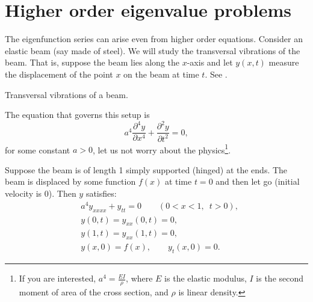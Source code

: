 
\sectionnewpage
\section{Higher order eigenvalue problems}
\label{sec:appeig}


The eigenfunction series can arise even from higher order equations.
Consider an elastic beam (say made of steel).  We will study the
transversal vibrations of the beam.  That is, suppose the beam lies along
the $x$-axis and let $y(x,t)$ measure the displacement of the point $x$
on the beam at time $t$.  See .

\begin{myfig}
\capstart
{}
\caption{Transversal vibrations of a beam.\label{appeig:transbeamfig}}
\end{myfig}

The equation that governs this setup is
\begin{equation*}
a^4 \frac{\partial^4 y}{\partial x^4} + \frac{\partial^2 y}{\partial t^2} = 0,
\end{equation*}
for some constant $a > 0$, let us not worry about the physics\footnote{If
you are interested, $a^4 = \frac{EI}{\rho}$, where $E$ is the elastic
modulus, $I$ is the second moment of area of the cross section,
and $\rho$ is linear density.}.

Suppose the beam is of length 1 simply supported (hinged) at the ends.
The beam is displaced by some function $f(x)$ at time $t=0$ and then
let go (initial velocity is 0).  Then $y$ satisfies:
\begin{equation} \label{appeig:beameq}
\begin{aligned}
& a^4 y_{xxxx} + y_{tt} = 0 \qquad (0 < x < 1, \enspace t > 0), \\
& y(0,t) = y_{xx}(0,t) = 0 , \\
& y(1,t) = y_{xx}(1,t) = 0 , \\
& y(x,0) = f(x), \qquad y_{t}(x,0) = 0 .
\end{aligned}
\end{equation}

